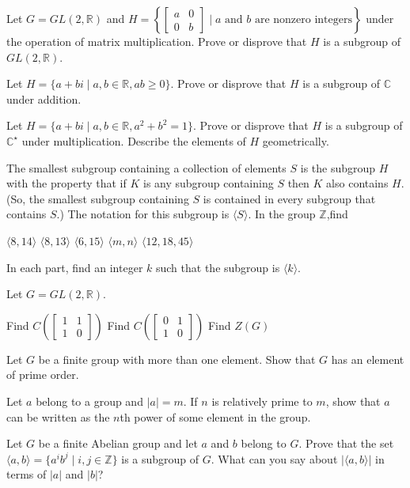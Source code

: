 \documentclass[11pt,largemargins]{homework}
\begin{document}
\question
Let $G=GL(2,\mathbb{R})$ and $H=\left\{\begin{bmatrix} a & 0 \\ 0 & b \end{bmatrix} \;|\;a\text{ and }b\text{ are 
nonzero integers}\right\}$ under the operation of matrix multiplication. Prove or disprove that $H$ is a subgroup of 
$GL(2,\mathbb{R})$.

\question
Let $H=\{a+bi\;|\; a,b\in\mathbb{R},ab\geq 0\}$. Prove or disprove that $H$ is a subgroup of $\mathbb{C}$ under addition.

\question
Let $H=\{a+bi\;|\; a,b\in\mathbb{R},a^2+b^2=1\}$. Prove or disprove that $H$ is a subgroup of $\mathbb{C}^\star$ under 
multiplication. Describe the elements of $H$ geometrically.

\question
The smallest subgroup containing a collection of elements $S$ is the subgroup $H$ with the property that if $K$ is any subgroup 
containing $S$ then $K$ also contains $H$. (So, the smallest subgroup containing $S$ is contained in every subgroup that 
contains $S$.) The notation for this subgroup is $\langle S \rangle$. In the group $\mathbb{Z}$,find 
\begin{alphaparts}
    \questionpart
    $\langle 8,14 \rangle$
    \questionpart
    $\langle 8,13 \rangle$
    \questionpart
    $\langle 6,15 \rangle$
    \questionpart
    $\langle m,n \rangle$
    \questionpart
    $\langle 12,18,45 \rangle$
\end{alphaparts}
In each part, find an integer $k$ such that the subgroup is $\langle k\rangle$.

\question
Let $G=GL(2,\mathbb{R})$.
\begin{alphaparts}
    \questionpart
    Find $C\left(\begin{bmatrix} 1 & 1 \\ 1 & 0 \end{bmatrix}\right)$
    \questionpart
    Find $C\left(\begin{bmatrix} 0 & 1 \\ 1 & 0 \end{bmatrix}\right)$
    \questionpart
    Find $Z(G)$
\end{alphaparts}

\question
Let $G$ be a finite group with more than one element. Show that $G$ has an element of prime order.

\question
Let $a$ belong to a group and $|a|=m$. If $n$ is relatively prime to $m$, show that $a$ can be written as the $n$th power 
of some element in the group.

\question
Let $G$ be a finite Abelian group and let $a$ and $b$ belong to $G$. Prove that the set 
$\langle a,b\rangle=\{a^ib^j\;|\;i,j \in\mathbb{Z}\}$ is a subgroup of $G$. What can you say about $|\langle a,b\rangle|$ in 
terms of $|a|$ and $|b|$?
\end{document}
